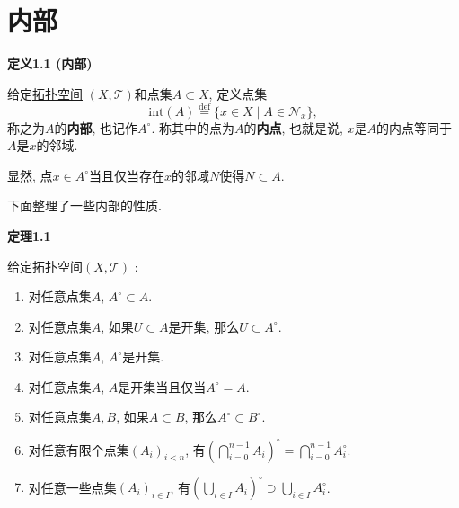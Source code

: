 \documentclass[UTF8]{ctexart}
\begin{document}
\setlength{\abovedisplayskip}{1pt}
\setlength{\belowdisplayskip}{1pt}

\section{内部}

\hypertarget{sec:定义1.1}{}
\noindent\textbf{定义1.1 (内部)}

给定\href{01 拓扑空间#nameddest=sec:定义1.1}{拓扑空间}
$(X,\mathcal{T})$和点集$A\subset X$, 定义点集
\[
    \mathrm{int}(A)\overset{\mathrm{def}}{=}\{x\in X\mid
    A\in\mathcal{N}_x\},
\]
称之为$A$的\textbf{内部}, 也记作$A^\circ$. 称其中的点为$A$的\textbf{内点},
也就是说, $x$是$A$的内点等同于$A$是$x$的邻域.

显然, 点$x\in A^\circ$当且仅当存在$x$的邻域$N$使得$N\subset A$.

\vspace{10pt}

下面整理了一些内部的性质.

\vspace{10pt}

\hypertarget{sec:定理1.1}{}
\noindent\textbf{定理1.1}

给定拓扑空间$(X,\mathcal{T})$ :
\begin{enumerate}
    \item 对任意点集$A$, $A^\circ\subset A$.
    \item 对任意点集$A$, 如果$U\subset A$是开集, 那么$U\subset A^\circ$.
    \item 对任意点集$A$, $A^\circ$是开集.
    \item 对任意点集$A$, $A$是开集当且仅当$A^\circ=A$.
    \item 对任意点集$A,B$, 如果$A\subset B$, 那么$A^\circ\subset B^\circ$.
    \vspace{3pt}
    \item 对任意有限个点集$(A_i)_{i<n}$, 有$\displaystyle
    \left(\bigcap_{i=0}^{n-1}A_i\right)^\circ=\bigcap_{i=0}^{n-1}A_i^\circ$.
    \vspace{3pt}
    \item 对任意一些点集$(A_i)_{i\in I}$, 有$\displaystyle
    \left(\bigcup_{i\in I}A_i\right)^\circ\supset\bigcup_{i\in I}A_i^\circ$.
\end{enumerate}

\end{document}
